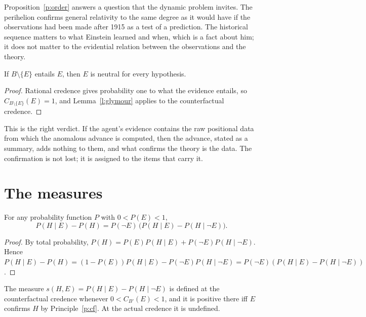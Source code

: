 \documentclass{situationist-preprint}
\begin{document}
Proposition~\ref{p:order} answers a question that the dynamic problem invites. The perihelion confirms general relativity to the same degree as it would have if the observations had been made after 1915 as a test of a prediction. The historical sequence matters to what Einstein learned and when, which is a fact about him; it does not matter to the evidential relation between the observations and the theory.

\begin{proposition}[Redundancy]\label{p:redundant}
If $B \setminus \{E\}$ entails $E$, then $E$ is neutral for every hypothesis.
\end{proposition}

\begin{proof}
Rational credence gives probability one to what the evidence entails, so $C_{B \setminus \{E\}}(E) = 1$, and Lemma~\ref{l:glymour} applies to the counterfactual credence.
\end{proof}

This is the right verdict. If the agent's evidence contains the raw positional data from which the anomalous advance is computed, then the advance, stated as a summary, adds nothing to them, and what confirms the theory is the data. The confirmation is not lost; it is assigned to the items that carry it.

\section{The measures}\label{s:measures}

\begin{proposition}[Decomposition]\label{p:decomp}
For any probability function $P$ with $0 < P(E) < 1$,
\[
P(H \mid E) - P(H) = P(\neg E)\,\bigl(P(H \mid E) - P(H \mid \neg E)\bigr).
\]
\end{proposition}

\begin{proof}
By total probability, $P(H) = P(E)P(H \mid E) + P(\neg E) P(H \mid \neg E)$. Hence $P(H \mid E) - P(H) = (1 - P(E)) P(H \mid E) - P(\neg E) P(H \mid \neg E) = P(\neg E)(P(H \mid E) - P(H \mid \neg E))$.
\end{proof}

\begin{corollary}\label{c:s}
The measure $s(H, E) = P(H \mid E) - P(H \mid \neg E)$ is defined at the counterfactual credence whenever $0 < C_{B'}(E) < 1$, and it is positive there iff $E$ confirms $H$ by Principle~\ref{p:cf}. At the actual credence it is undefined.
\end{corollary}
\end{document}
